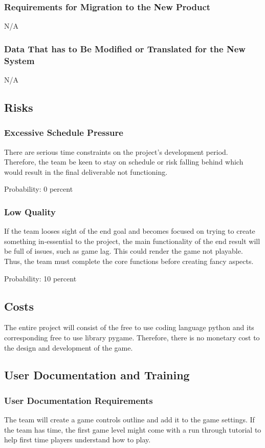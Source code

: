 \documentclass[12pt, titlepage]{article}
\begin{document}
\subsubsection{Requirements for Migration to the New Product}
N/A

\subsubsection{Data That has to Be Modified or Translated for the New System}
N/A

\subsection{Risks}
\subsubsection{Excessive Schedule Pressure}
There are serious time constraints on the project's development period. Therefore, the team be keen to stay on schedule or risk falling behind which would result in the final deliverable not functioning.

Probability: 0 percent

\subsubsection{Low Quality}
If the team looses sight of the end goal and becomes focused on trying to create something in-essential to the project, the main functionality of the end result will be full of issues, such as game lag. This could render the game not playable. Thus, the team must complete the core functions before creating fancy aspects.

Probability: 10 percent

\subsection{Costs}
The entire project will consist of the free to use coding language python and its corresponding free to use library pygame. Therefore, there is no monetary cost to the design and development of the game.

\subsection{User Documentation and Training}
\subsubsection{User Documentation Requirements}
The team will create a game controls outline and add it to the game settings. If the team has time, the first game level might come with a run through tutorial to help first time players understand how to play. 
\end{document}
